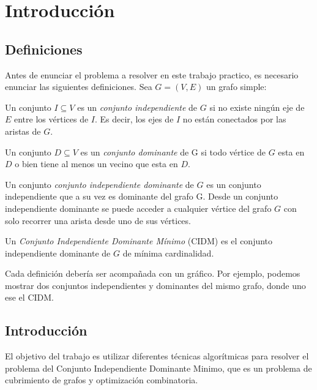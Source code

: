\section{Introducción}

\subsection{Definiciones}

Antes de enunciar el problema a resolver en este trabajo practico, es necesario enunciar las siguientes definiciones.
Sea $G = (V,E)$ un grafo simple:
\begin{definition}
Un conjunto $I \subseteq V$ es un \textit{conjunto independiente} de $G$ si no existe ningún eje de $E$ entre los vértices de $I$. Es decir, los ejes de $I$ no están conectados por las aristas de $G$.
\end{definition}

\begin{definition}
Un conjunto $D \subseteq V$ es un \textit{conjunto dominante} de G si todo vértice de $G$ esta en $D$ o bien tiene al menos un vecino que esta en $D$.
\end{definition}

\begin{definition}
Un conjunto \textit{conjunto independiente dominante} de $G$ es un conjunto independiente que a su vez es dominante del grafo G. Desde un conjunto independiente dominante se puede acceder a cualquier vértice del grafo $G$ con solo recorrer una arista desde uno de sus vértices.
\end{definition}

\begin{definition}
Un \textit{Conjunto Independiente Dominante Mínimo} (CIDM) es el conjunto independiente dominante de $G$ de mínima cardinalidad.
\end{definition}

Cada definición debería ser acompañada con un gráfico. Por ejemplo, podemos mostrar dos conjuntos independientes y dominantes del mismo grafo, donde uno ese el CIDM.

\subsection{Introducción}
El objetivo del trabajo es utilizar diferentes técnicas algorítmicas para resolver el problema del Conjunto Independiente Dominante Minimo, que es un problema de cubrimiento de grafos y optimización combinatoria.


